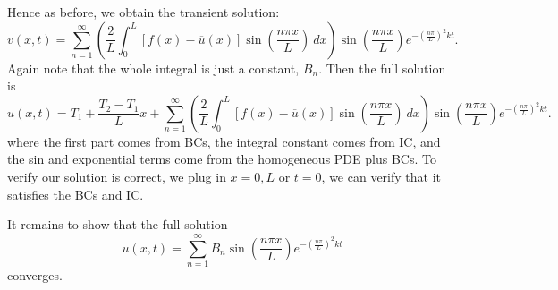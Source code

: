 \documentclass[class=article,crop=false]{standalone}
\begin{document}
\begin{eg}[]
Hence as before, we obtain the transient solution:
\[
	v(x,t)= \sum_{ n= 1}^{\infty}  \left( \frac{2}{L} \int_{0}^{L} \left[ f(x)-\overline{u}(x) \right] \sin \left( \frac{ n\pi x}{ L} \right) \ dx  \right) \sin \left( \frac{ n\pi x}{ L} \right) e^{-\left( \frac{n \pi}{L} \right)^2 kt }
.\]
Again note that the whole integral is just a constant, $ B_n$. Then the full solution is
\[
	u(x,t)=T_1 + \frac{T_2-T_1}{L}x + \sum_{ n= 1}^{\infty} \left( \frac{2}{L} \int_{0}^{L} \left[ f(x) - \overline{u}(x) \right] \sin \left( \frac{ n\pi x}{ L} \right)\ dx  \right) \sin \left( \frac{ n\pi x}{ L} \right) e^{-\left( \frac{n \pi}{L} \right)^2 kt } 
.\] 
where the first part comes from BCs, the integral constant comes from IC, and the sin and exponential terms come from the homogeneous PDE plus BCs. To verify our solution is correct, we plug in $ x=0,L$ or  $ t=0$, we can verify that it satisfies the BCs and IC.

It remains to show that the full solution
\[
	u(x,t) = \sum_{ n= 1}^{\infty} B_n \sin \left( \frac{ n\pi x}{ L} \right) e^{-\left( \frac{n \pi}{L} \right)^2 kt}
\] 
converges.
\end{eg}
\end{document}
